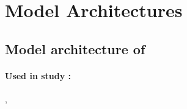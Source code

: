 \documentclass[10pt]{article}
\begin{document}

\section{Model Architectures}
\subsection{Model architecture of 
            \label{model:\VAR{model['modelname']}}
            }
\paragraph{Used in study \No{}:}
    \hyperref[training:\VAR{summaries[k]['model']['reportnumber']}]
             {},
    \hyperref[training:\VAR{summaries[-1]['model']['reportnumber']}]
             {}
\vspace{-2ex}
%
\end{document}
